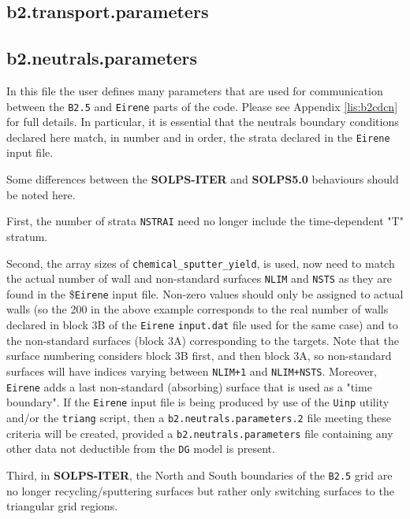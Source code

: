 \documentclass[a4paper,10pt]{report}
\newcommand\SOLPSITER{{\bf SOLPS-ITER} }
\newcommand\SOLPSITERns{{\bf SOLPS-ITER}}
\begin{document}
\subsection{b2.transport.parameters}

\subsection{b2.neutrals.parameters}

In this file the user defines many parameters that are used for communication
between the
{\tt B2.5} and {\tt Eirene} parts of the code. Please see Appendix
\ref{lis:b2cdcn} for full details. In particular, it is
essential that the neutrals boundary conditions declared here match, in
number and in order, the strata declared in the {\tt Eirene} input file.

Some differences between the \SOLPSITER and {\bf SOLPS5.0} behaviours
should be noted here.

First, the number of strata {\tt NSTRAI} need no longer include the
time-dependent "T" stratum.

Second, the array sizes of {\tt chemical\_sputter\_yield}, is used, now need to match the
actual number of wall and non-standard surfaces
{\tt NLIM} and {\tt NSTS} as they are found in the \${\tt Eirene} input file.
Non-zero values should only be assigned to
actual walls (so the 200 in the above example corresponds to the real number of walls declared in block 3B of the {\tt Eirene}
{\tt input.dat} file used for the same case) and to the non-standard surfaces (block 3A) corresponding to the targets. Note that
the surface numbering considers block 3B first, and then block 3A, so non-standard surfaces will have
indices varying between {\tt NLIM+1} and {\tt NLIM+NSTS}. Moreover,
{\tt Eirene} adds a last non-standard (absorbing) surface that is used as a "time
boundary". If the {\tt Eirene} input file is being produced by use of the
{\tt Uinp} utility and/or the {\tt triang} script, then a
{\tt b2.neutrals.parameters.2} file meeting these criteria will be created,
provided a {\tt b2.neutrals.parameters} file containing any other data not
deductible from the {\tt DG} model is present.

Third, in \SOLPSITERns, the North and South boundaries of the {\tt B2.5} grid are
no longer recycling/sputtering surfaces but rather only switching surfaces to the
triangular grid regions.
\end{document}
